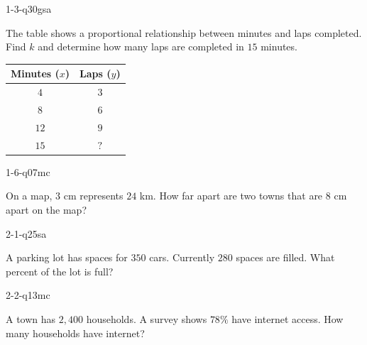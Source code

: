 
\begin{practiceQuestion}{1-3-q30}{gsa}
\begin{questionText}
The table shows a proportional relationship between minutes and laps completed. Find $k$ and determine how many laps are completed in $15$ minutes.

\begin{center}
\begin{tabular}{|c|c|}
\hline
\textbf{Minutes ($x$)} & \textbf{Laps ($y$)} \\ \hline
$4$ & $3$ \\ \hline
$8$ & $6$ \\ \hline
$12$ & $9$ \\ \hline
$15$ & $?$ \\ \hline
\end{tabular}
\end{center}
\end{questionText}
\end{practiceQuestion}

\begin{practiceQuestion}{1-6-q07}{mc}
\begin{questionText}
On a map, $3$ cm represents $24$ km. How far apart are two towns that are $8$ cm apart on the map?
\end{questionText}
\end{practiceQuestion}

\begin{practiceQuestion}{2-1-q25}{sa}
\begin{questionText}
A parking lot has spaces for $350$ cars. Currently $280$ spaces are filled. What percent of the lot is full?
\end{questionText}
\end{practiceQuestion}

\begin{practiceQuestion}{2-2-q13}{mc}
\begin{questionText}
A town has $2{,}400$ households. A survey shows $78\%$ have internet access. How many households have internet?
\end{questionText}
\end{practiceQuestion}

